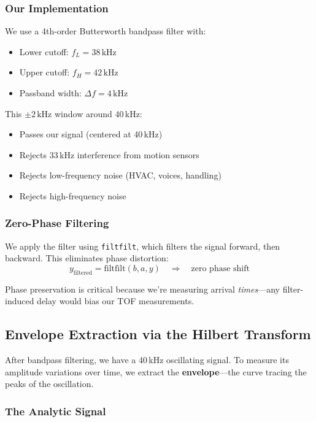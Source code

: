 \documentclass[11pt]{article}
\begin{document}
\subsubsection{Our Implementation}

We use a 4th-order Butterworth bandpass filter with:
\begin{itemize}
    \item Lower cutoff: $f_L = 38\,\text{kHz}$
    \item Upper cutoff: $f_H = 42\,\text{kHz}$
    \item Passband width: $\Delta f = 4\,\text{kHz}$
\end{itemize}

This $\pm 2\,\text{kHz}$ window around 40\,kHz:
\begin{itemize}
    \item Passes our signal (centered at 40\,kHz)
    \item Rejects 33\,kHz interference from motion sensors
    \item Rejects low-frequency noise (HVAC, voices, handling)
    \item Rejects high-frequency noise
\end{itemize}

\subsubsection{Zero-Phase Filtering}

We apply the filter using \texttt{filtfilt}, which filters the signal forward, then backward. This eliminates phase distortion:
\begin{equation}
    y_{\text{filtered}} = \text{filtfilt}(b, a, y) \quad \Rightarrow \quad \text{zero phase shift}
\end{equation}

Phase preservation is critical because we're measuring arrival \textit{times}---any filter-induced delay would bias our TOF measurements.

\subsection{Envelope Extraction via the Hilbert Transform}

After bandpass filtering, we have a 40\,kHz oscillating signal. To measure its amplitude variations over time, we extract the \textbf{envelope}---the curve tracing the peaks of the oscillation.

\subsubsection{The Analytic Signal}
\end{document}
